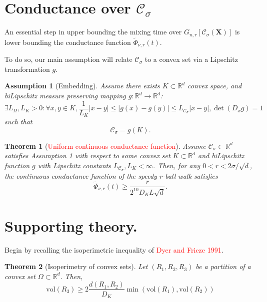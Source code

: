 \documentclass{article}
\newcommand{\Reals}{\mathbb{R}}
\newcommand{\abs}[1]{\left \lvert #1 \right \rvert}
\newcommand{\vol}{\mathrm{vol}}
\newcommand{\Rd}{\Reals^d}
\newcommand{\Xbf}{\mathbf{X}}
\newcommand{\Cset}{\mathcal{C}}
\newcommand{\Csig}{\Cset_{\sigma}}
\newcommand{\1}{\mathbf{1}}
\theoremstyle{alden}
\theoremstyle{aldenthm}
\newtheorem{theorem}{Theorem}
\newtheorem{assumption}{Assumption}
\theoremstyle{remark}
\begin{document}
\section{Conductance over $\Csig$}
An essential step in upper bounding the mixing time over $G_{n,r}[\Csig(\Xbf)]$ is lower bounding the conductance function $\widetilde{\Phi}_{\nu,r}(t)$. 

 
To do so, our main assumption will relate $\Csig$ to a convex set via a Lipschitz transformation $g$.

\begin{assumption}[Embedding]
	\label{asmp: embedding}
	 Assume there exists $K \subset \Rd$ convex space, and biLipschitz measure preserving mapping $g: \Rd \to \Rd$:
	\begin{equation*}
	\exists L_{\Omega},L_K > 0: \forall x,y \in K,  \frac{1}{L_K} \abs{x - y}\leq \abs{g(x) - g(y)} \leq L_{\Csig} \abs{x - y}, \det(D_x g) = 1
	\end{equation*}
	such that
	\begin{equation*}
	\Csig = g(K).
	\end{equation*}
\end{assumption}

\begin{theorem}[\textcolor{red}{Uniform continuous conductance function}]
	Assume $\Csig \subset \Rd$ satisfies Assumption \ref{asmp: embedding} with respect to some convex set $K \subset \Rd$ and biLipschitz function $g$ with Lipschitz constants $L_{\Csig}, L_K <  \infty$. Then, for any $0 < r < 2 \sigma / \sqrt{d}$, the continuous conductance function of the speedy $r$-ball walk satisfies
	\begin{equation*}
	\widetilde{\Phi}_{\nu,r}(t) \geq \frac{r}{2^{10} D_K L \sqrt{d}}.
	\end{equation*}
\end{theorem}

\section{Supporting theory.}
Begin by recalling the isoperimetric inequality of \textcolor{red}{Dyer and Frieze 1991}. 

\begin{theorem}[Isoperimetry of convex sets]
	\label{thm: dyer}
	Let $(R_1, R_2, R_3)$ be a partition of a convex set $\Omega \subset \Rd$. Then,
	\begin{equation*}
	\vol(R_3) \geq 2\frac{d(R_1, R_2)}{D_{K}} \min(\vol(R_1), \vol(R_2))
	\end{equation*}
\end{theorem}
\end{document}

